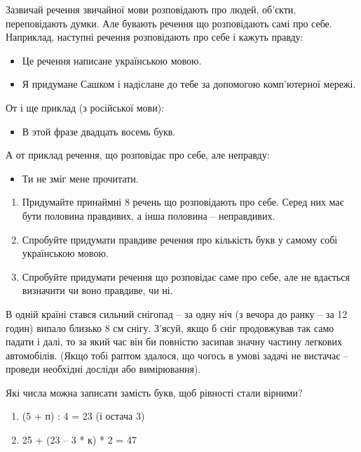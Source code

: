 \problem
Зазвичай речення звичайної мови розповідають про людей, об'єкти,
переповідають думки.
Але бувають речення що розповідають самі про себе.
Наприклад, наступні речення розповідають про себе і кажуть правду:
\begin{itemize}
    \item Це речення написане українською мовою.
    \item Я придумане Сашком і надіслане до тебе
    за допомогою комп’ютерної мережі.
\end{itemize}
От і ще приклад (з російської мови):
\begin{itemize}
    \item В этой фразе двадцать восемь букв.
\end{itemize}
А от приклад речення, що розповідає про себе, але неправду:
\begin{itemize}
    \item Ти не зміг мене прочитати.
\end{itemize}

\begin{enumerate}
    \item Придумайте принаймні 8 речень що розповідають про себе.
    Серед них має бути половина правдивих, а інша половина – неправдивих.
    \item Спробуйте придумати правдиве речення про кількість букв
    у самому собі українською мовою. 
    \item Спробуйте придумати речення що розповідає саме про себе,
    але не вдається визначити чи воно правдиве, чи ні.
\end{enumerate}


\problem
В одній країні стався сильний снігопад – за одну ніч
(з вечора до ранку – за 12 годин) випало близько 8 см снігу.
З'ясуй, якщо б сніг продовжував так само падати і далі,
то за який час він би повністю засипав значну частину легкових автомобілів.
(Якщо тобі раптом здалося, що чогось в умові задачі не вистачає –
проведи необхідні досліди або вимірювання).


\problem
Які числа можна записати замість букв, щоб рівності стали вірними?
\begin{enumerate}
    \item (5 + п) : 4 = 23 (і остача 3)
    \item 25 + (23 – 3 * к) * 2 = 47
\end{enumerate}


